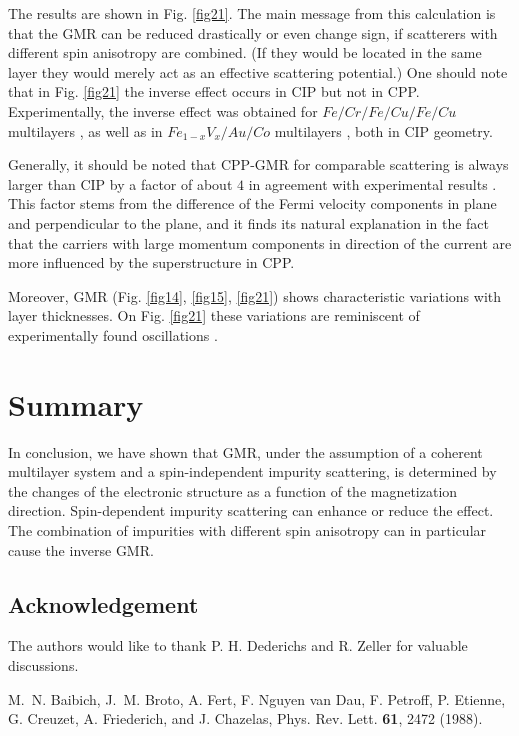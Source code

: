 {%
%
The results are shown in Fig. \ref{fig21}. The main message from this calculation
is that the GMR can be reduced drastically or even change sign,
if scatterers with different spin anisotropy are combined. (If they would be
located in the same layer they would merely act as an effective scattering
potential.) One should note that in Fig. \ref{fig21} the inverse
effect occurs in CIP but not in CPP.
Experimentally, the inverse effect was obtained for $Fe/Cr/Fe/Cu/Fe/Cu$
multilayers \cite{george94}, as well as in $Fe_{1-x}V_x/Au/Co$
multilayers \cite{renard95}, both in CIP geometry.\par
%
Generally, it should be noted that CPP-GMR for comparable scattering is always
larger than CIP by a factor of about $4$ in agreement with experimental results
\cite{gijs95}. This factor stems from the difference of the Fermi
velocity components in plane and perpendicular to the plane, and it
finds its natural explanation in the fact that the carriers
with large momentum components in direction of the current are more
influenced by the superstructure in CPP.\par
Moreover, GMR (Fig. \ref{fig14}, \ref{fig15}, \ref{fig21}) shows characteristic variations
with layer thicknesses.
On Fig. \ref{fig21} these variations are reminiscent of experimentally found
oscillations \cite{okuno94}.
%
\section*{Summary}
In conclusion,
we have shown that GMR, under the assumption of a coherent multilayer
system and a spin-independent impurity scattering, is determined
by the changes of the electronic structure as a function of the magnetization
direction.
Spin-dependent impurity scattering can enhance or reduce the effect.
The combination of impurities with different spin anisotropy can
in particular cause the inverse GMR.
%
\subsection*{Acknowledgement}
The authors would like to thank P. H. Dederichs and R. Zeller 
for valuable discussions. 
%
\begin{thebibliography}{m}\small

M.~N. Baibich, J.~M. Broto, A. Fert, F. {Nguyen van Dau}, F. Petroff, P.
  Etienne, G. Creuzet, A. Friederich, and J. Chazelas, Phys. Rev. Lett. {\bf
  61},  2472  (1988).


\end{thebibliography}}
